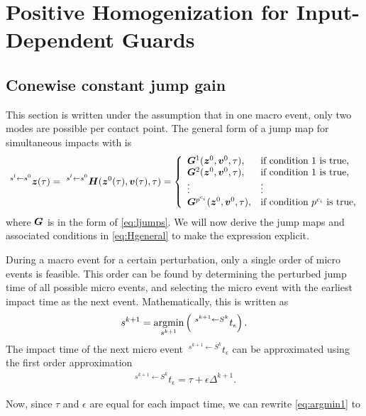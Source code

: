 \documentclass[../DC2017114Bouma.tex]{subfiles}
\begin{document}
\cleartooddpage
\chapter{Positive Homogenization for Input-Dependent Guards}
\section{Conewise constant jump gain}
This section is written under the assumption that in one macro event, only two modes are possible per contact point. The general form of a jump map for simultaneous impacts with is 
\begin{align}
\ ^{s^l\leftarrow s^0}{\boldsymbol{z}}(\tau)= \ ^{s^l \leftarrow s^0}{\boldsymbol{H}}({\boldsymbol{z}}^{0}(\tau),{\boldsymbol{v}}(\tau),\tau) = \left\lbrace\begin{array}{ll}
{\boldsymbol{G}}^1({\boldsymbol{z}}^0,{\boldsymbol{v}}^0,\tau), & \text{if condition 1 is true},\\
{\boldsymbol{G}}^2({\boldsymbol{z}}^0,{\boldsymbol{v}}^0,\tau), & \text{if condition 1 is true},\\
\vdots & \vdots\\
{\boldsymbol{G}}^{p^{c_i}}({\boldsymbol{z}}^0,{\boldsymbol{v}}^0,\tau), & \text{if condition }p^{c_i}\text{ is true},
\end{array}\right.\label{eq:Hgeneral}
\end{align}
where ${\boldsymbol{G}}$ is in the form of \eqref{eq:ljumps}. We will now derive the jump maps and associated conditions in \eqref{eq:Hgeneral} to make the expression explicit.

During a macro event for a certain perturbation, only a single order of micro events is feasible. This order can be found by determining the perturbed jump time of all possible micro events, and selecting the micro event with the earliest impact time as the next event. Mathematically, this is written as
\begin{align}
s^{k+1} = \underset{s^{k+1}}{\operatorname{\text{argmin}}}\left(\ ^{s^{k+1} \leftarrow S^{k}}t_\epsilon\right).\label{eq:argmin1}
\end{align}
The impact time of the next micro event $\ ^{s^{k+1} \leftarrow S^{k}}t_\epsilon$ can be approximated using the first order approximation
\begin{align}
\ ^{s^{k+1} \leftarrow S^{k}}t_\epsilon = \tau + \epsilon\Delta^{k+1}.
\end{align}

Now, since $\tau$ and $\epsilon$ are equal for each impact time, we can rewrite \eqref{eq:argmin1} to
\end{document}
